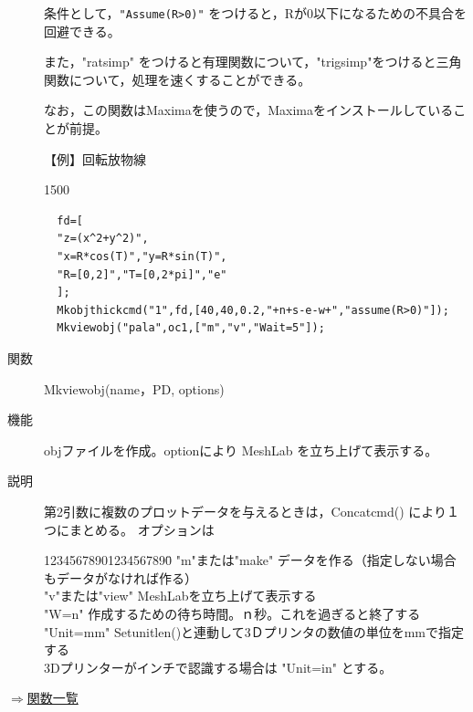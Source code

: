 \documentclass[papersize,a4paper,12pt,uplatex]{jsarticle}
\begin{document}
\begin{description}
条件として，\verb|"Assume(R>0)"| をつけると，Rが0以下になるための不具合を回避できる。

また，"ratsimp" をつけると有理関数について，"trigsimp"をつけると三角関数について，処理を速くすることができる。

なお，この関数はMaximaを使うので，Maximaをインストールしていることが前提。

\vspace{\baselineskip}
【例】回転放物線

\begin{layer}{150}{0}
\end{layer}
\begin{verbatim}
  fd=[
  "z=(x^2+y^2)",
  "x=R*cos(T)","y=R*sin(T)",
  "R=[0,2]","T=[0,2*pi]","e"
  ];
  Mkobjthickcmd("1",fd,[40,40,0.2,"+n+s-e-w+","assume(R>0)"]);
  Mkviewobj("pala",oc1,["m","v","Wait=5"]); 
\end{verbatim}


\vspace{\baselineskip}
\hypertarget{mkviewobj}{}
\item[関数]  Mkviewobj(name，PD, options)
\item[機能]  objファイルを作成。optionにより MeshLab を立ち上げて表示する。
\item[説明]  第2引数に複数のプロットデータを与えるときは，Concatcmd() により１つにまとめる。
オプションは 
\begin{tabbing}
12345678901234567890\=\kill
  "m"または"make"  \> データを作る（指定しない場合もデータがなければ作る）\\
  "v"または"view"    \>MeshLabを立ち上げて表示する\\
  "W=n"            \>作成するための待ち時間。ｎ秒。これを過ぎると終了する\\
  "Unit=mm"        \>Setunitlen()と連動して3Ｄプリンタの数値の単位をmmで指定する\\
    \>3Dプリンターがインチで認識する場合は "Unit=in" とする。\\
\end{tabbing}


\end{description}
\begin{flushright}  \hyperlink{functionlist}{$\Rightarrow$関数一覧}\end{flushright}
\end{document}
